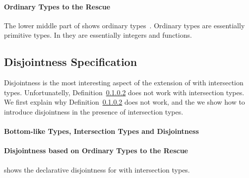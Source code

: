 \paragraph{Ordinary Types to the Rescue}
The lower middle part of
 shows ordinary types~\cite{}.
Ordinary types are essentially primitive types. In \cal they
are essentially integers and functions. 

\subsection{Disjointness Specification}
\label{sec:inter:disj}
Disjointness is the most interesting aspect of the extension of \cal with
intersection types. Unfortunatelly, Definition~\ref{} does not work with intersection
types. We first explain why Definition~\ref{} does not work, and the
we show how to introduce disjointness in the presence of intersection types. 


\paragraph{Bottom-like Types, Intersection Types and Disjointness}


\paragraph{Disjointness based on Ordinary Types to the Rescue}
 shows the declarative disjointness for \cal with intersection types.

